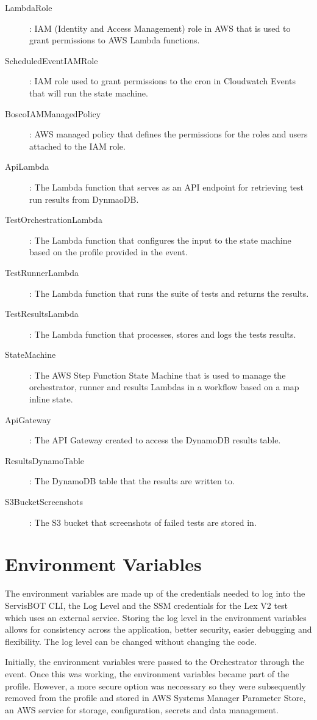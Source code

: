 \documentclass[12pt,a4paper,titlepage]{report}
\begin{document}
\begin{description}
  \item [LambdaRole]: IAM (Identity and Access Management) role in AWS that is used to grant permissions to AWS Lambda functions.
  \item [ScheduledEventIAMRole]: IAM role used to grant permissions to the cron in Cloudwatch Events that will run the state machine.
  \item [BoscoIAMManagedPolicy]: AWS managed policy that defines the permissions for the roles and users attached to the IAM role.
  \item [ApiLambda]: The Lambda function that serves as an API endpoint for retrieving test run results from DynmaoDB.
  \item [TestOrchestrationLambda]: The Lambda function that configures the input to the state machine based on the profile provided in the event.
  \item [TestRunnerLambda]: The Lambda function that runs the suite of tests and returns the results.
  \item [TestResultsLambda]: The Lambda function that processes, stores and logs the tests results.
  \item [StateMachine]: The AWS Step Function State Machine that is used to manage the orchestrator, runner and results Lambdas in a workflow based on a map inline state. 
  \item [ApiGateway]: The API Gateway created to access the DynamoDB results table.
  \item [ResultsDynamoTable]: The DynamoDB table that the results are written to.
  \item [S3BucketScreenshots]: The S3 bucket that screenshots of failed tests are stored in.
\end{description}

\section{Environment Variables}
The environment variables are made up of the credentials needed to log into the ServisBOT CLI, the Log Level and the SSM credentials for the Lex V2 test which uses an external service.  
Storing the log level in the environment variables allows for consistency across the application, better security, easier debugging and flexibility. 
The log level can be changed without changing the code.

Initially, the environment variables were passed to the Orchestrator through the event. Once this was working, the environment variables became part of the profile. However, a more 
secure option was neccessary so they were subsequently removed from the profile and stored in AWS Systems Manager Parameter Store, an AWS service for storage, configuration, secrets and data management. 
\end{document}
